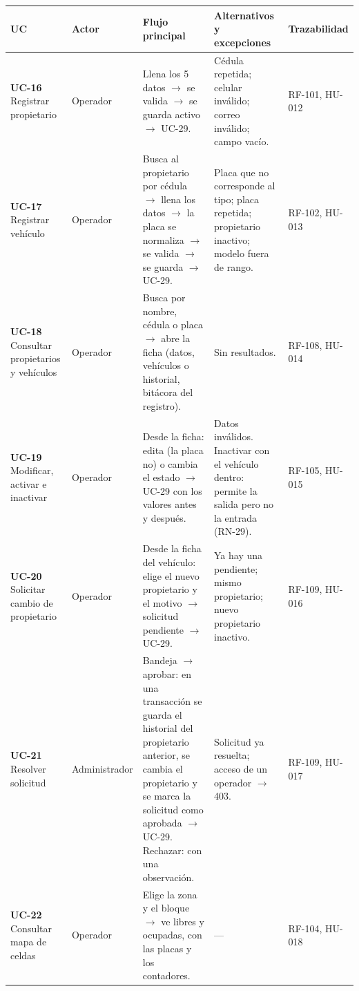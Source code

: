 \begin{longtable}{>{\raggedright\arraybackslash}p{2.4000000000000004cm}>{\raggedright\arraybackslash}p{2.6cm}>{\raggedright\arraybackslash}p{3.8cm}>{\raggedright\arraybackslash}p{3.2cm}>{\raggedright\arraybackslash}p{2.4000000000000004cm}}
\toprule
\textbf{UC} & \textbf{Actor} & \textbf{Flujo principal} & \textbf{Alternativos y excepciones} & \textbf{Trazabilidad}\\
\midrule\endhead
\textbf{UC-16} Registrar propietario & Operador & Llena los 5 datos $\rightarrow$ se valida $\rightarrow$ se guarda activo $\rightarrow$ UC-29. & Cédula repetida; celular inválido; correo inválido; campo vacío. & RF-101, HU-012\\
\textbf{UC-17} Registrar vehículo & Operador & Busca al propietario por cédula $\rightarrow$ llena los datos $\rightarrow$ la placa se normaliza $\rightarrow$ se valida $\rightarrow$ se guarda $\rightarrow$ UC-29. & Placa que no corresponde al tipo; placa repetida; propietario inactivo; modelo fuera de rango. & RF-102, HU-013\\
\textbf{UC-18} Consultar propietarios y vehículos & Operador & Busca por nombre, cédula o placa $\rightarrow$ abre la ficha (datos, vehículos o historial, bitácora del registro). & Sin resultados. & RF-108, HU-014\\
\textbf{UC-19} Modificar, activar e inactivar & Operador & Desde la ficha: edita (la placa no) o cambia el estado $\rightarrow$ UC-29 con los valores antes y después. & Datos inválidos. Inactivar con el vehículo dentro: permite la salida pero no la entrada (RN-29). & RF-105, HU-015\\
\textbf{UC-20} Solicitar cambio de propietario & Operador & Desde la ficha del vehículo: elige el nuevo propietario y el motivo $\rightarrow$ solicitud pendiente $\rightarrow$ UC-29. & Ya hay una pendiente; mismo propietario; nuevo propietario inactivo. & RF-109, HU-016\\
\textbf{UC-21} Resolver solicitud & Administrador & Bandeja $\rightarrow$ aprobar: en una transacción se guarda el historial del propietario anterior, se cambia el propietario y se marca la solicitud como aprobada $\rightarrow$ UC-29. Rechazar: con una observación. & Solicitud ya resuelta; acceso de un operador $\rightarrow$ 403. & RF-109, HU-017\\
\textbf{UC-22} Consultar mapa de celdas & Operador & Elige la zona y el bloque $\rightarrow$ ve libres y ocupadas, con las placas y los contadores. & --- & RF-104, HU-018\\

\end{longtable}
